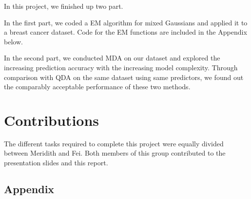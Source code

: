\documentclass[]{article}
\begin{document}
In this project, we finished up two part.

In the first part, we coded a EM algorithm for mixed Gaussians and
applied it to a breast cancer dataset. Code for the EM functions are
included in the Appendix below.

In the second part, we conducted MDA on our dataset and explored the
increasing prediction accuracy with the increasing model complexity.
Through comparison with QDA on the same dataset using same predictors,
we found out the comparably acceptable performance of these two methods.

\section{Contributions}\label{contributions}

The different tasks required to complete this project were equally
divided between Meridith and Fei. Both members of this group contributed
to the presentation slides and this report.

\subsection{Appendix}\label{appendix}
\end{document}
